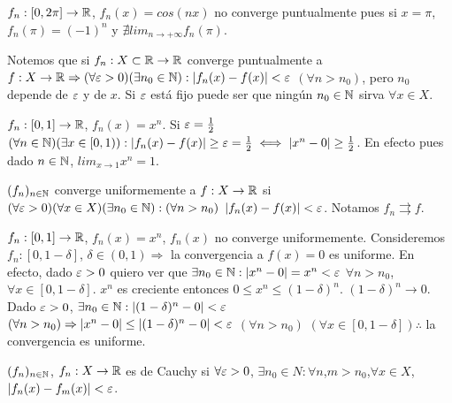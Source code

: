 \begin{eg}
  $f_n: [0, 2\pi] \to \mathbb{R}$, $f_n(x) = cos(nx)$ no converge puntualmente pues si $x = \pi$, $f_n(\pi) = (-1)^n$ y $\nexists lim_{n \to +\infty} f_n(\pi)$.
\end{eg}

Notemos que si $f_n: X \subset \mathbb{R} \to \mathbb{R}$ converge puntualmente a $f: X \to \mathbb{R} \Rightarrow (\forall \varepsilon > 0)(\exists n_0 \in \mathbb{N}) : |f_n(x) - f(x)| < \varepsilon$ $(\forall n > n_0)$, pero $n_0$ depende de $\varepsilon$ y de $x$. Si $\varepsilon$ está fijo puede ser que ningún $n_0 \in \mathbb{N}$ sirva $\forall x \in X$.

\begin{eg}
  $f_n: [0, 1] \to \mathbb{R}$, $f_n(x) = x^n$. Si $\varepsilon = \frac{1}{2}$ $(\forall n \in \mathbb{N})(\exists x \in [0, 1)) : |f_n(x) - f(x)| \geq \varepsilon = \frac{1}{2} \iff |x^n - 0| \geq \frac{1}{2}$. En efecto pues dado $n \in \mathbb{N}$, $lim_{x \to 1} x^n = 1$. 
\end{eg}

\begin{definition}
  $(f_n)_{n \in \mathbb{N}}$ converge uniformemente a $f: X \to \mathbb{R}$ si $(\forall \varepsilon > 0)(\forall x \in X)(\exists n_0 \in \mathbb{N}) : (\forall n > n_0)$ $ |f_n(x) - f(x)| < \varepsilon$. Notamos $f_n \rightrightarrows f$.
\end{definition}

\begin{eg}
  $f_n: [0, 1] \to \mathbb{R}$, $f_n(x) = x^n$, $f_n(x)$ no converge uniformemente. Consideremos $f_n: [0, 1 - \delta]$, $\delta \in (0, 1) \Rightarrow$ la convergencia a $f(x) = 0$ es uniforme. En efecto, dado $\varepsilon > 0$ quiero ver que $\exists n_0 \in \mathbb{N} : |x^n - 0| = x^n < \varepsilon$ $\forall n > n_0$, $\forall x \in [0, 1 - \delta]$. $x^n$ es creciente entonces $0 \leq x^n \leq (1-\delta)^n$. $(1-\delta)^n \to 0$. Dado $\varepsilon > 0$, $\exists n_0 \in \mathbb{N} : | (1-\delta)^n - 0 | < \varepsilon$ $(\forall n > n_0) \Rightarrow |x^n - 0| \leq |(1-\delta)^n - 0| < \varepsilon$ $(\forall n > n_0)$ $(\forall x \in [0, 1-\delta]) \therefore$ la convergencia es uniforme.  
\end{eg}

\begin{definition}
  $(f_n)_{n \in \mathbb{N}}$, $f_n: X \to \mathbb{R}$ es de Cauchy si $\forall \varepsilon > 0$, $\exists n_0 \in N : \forall n$,$m > n_0$,$\forall x \in X$, $|f_n(x) - f_m(x)| < \varepsilon$.
\end{definition}

